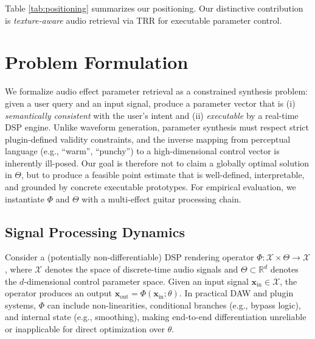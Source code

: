 Table \ref{tab:positioning} summarizes our positioning. Our distinctive contribution is \textit{texture-aware} audio retrieval via TRR for executable parameter control.

\section{Problem Formulation}
\label{sec:problem_formulation}

We formalize audio effect parameter retrieval as a constrained synthesis problem: given a user query and an input signal, produce a parameter vector that is (i) \textit{semantically consistent} with the user's intent and (ii) \textit{executable} by a real-time DSP engine. Unlike waveform generation, parameter synthesis must respect strict plugin-defined validity constraints, and the inverse mapping from perceptual language (e.g., ``warm'', ``punchy'') to a high-dimensional control vector is inherently ill-posed. Our goal is therefore not to claim a globally optimal solution in $\Theta$, but to produce a feasible point estimate that is well-defined, interpretable, and grounded by concrete executable prototypes. For empirical evaluation, we instantiate $\Phi$ and $\Theta$ with a multi-effect guitar processing chain.

\subsection{Signal Processing Dynamics}
Consider a (potentially non-differentiable) DSP rendering operator $\Phi: \mathcal{X} \times \Theta \to \mathcal{X}$, where $\mathcal{X}$ denotes the space of discrete-time audio signals and $\Theta \subset \mathbb{R}^d$ denotes the $d$-dimensional control parameter space. Given an input signal $\mathbf{x}_{\text{in}} \in \mathcal{X}$, the operator produces an output $\mathbf{x}_{\text{out}} = \Phi(\mathbf{x}_{\text{in}}; \theta)$.
In practical DAW and plugin systems, $\Phi$ can include non-linearities, conditional branches (e.g., bypass logic), and internal state (e.g., smoothing), making end-to-end differentiation unreliable or inapplicable for direct optimization over $\theta$.


